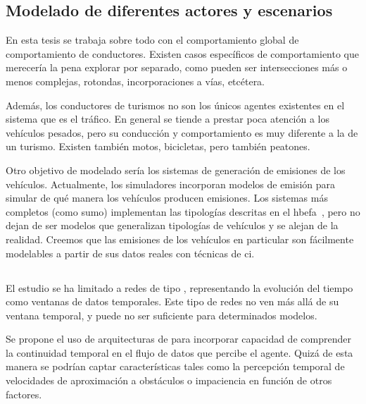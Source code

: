 \subsection{Modelado de diferentes actores y escenarios}

En esta tesis se trabaja sobre todo con el comportamiento global de comportamiento de conductores. Existen casos específicos de comportamiento que merecería la pena explorar por separado, como pueden ser intersecciones más o menos complejas, rotondas, incorporaciones a vías, etcétera.

Además, los conductores de turismos no son los únicos agentes existentes en el sistema que es el tráfico. En general se tiende a prestar poca atención a los vehículos pesados, pero su conducción y comportamiento es muy diferente a la de un turismo. Existen también motos, bicicletas, pero también peatones.

Otro objetivo de modelado sería los sistemas de generación de emisiones de los vehículos. Actualmente, los simuladores incorporan modelos de emisión para simular de qué manera los vehículos producen emisiones. Los sistemas más completos (como \gls{sumo}) implementan las tipologías descritas en el \gls{hbefa}~\cite{de2004modelling}, pero no dejan de ser modelos que generalizan tipologías de vehículos y se alejan de la realidad. Creemos que las emisiones de los vehículos en particular son fácilmente modelables a partir de sus datos reales con técnicas de \ac{ci}.

\subsection{}

El estudio se ha limitado a redes de tipo \textit{}, representando la evolución del tiempo como ventanas de datos temporales. Este tipo de redes no ven más allá de su ventana temporal, y puede no ser suficiente para determinados modelos.

Se propone el uso de arquitecturas de  para incorporar capacidad de comprender la continuidad temporal en el flujo de datos que percibe el agente. Quizá de esta manera se podrían captar características tales como la percepción temporal de velocidades de aproximación a obstáculos o impaciencia en función de otros factores.


